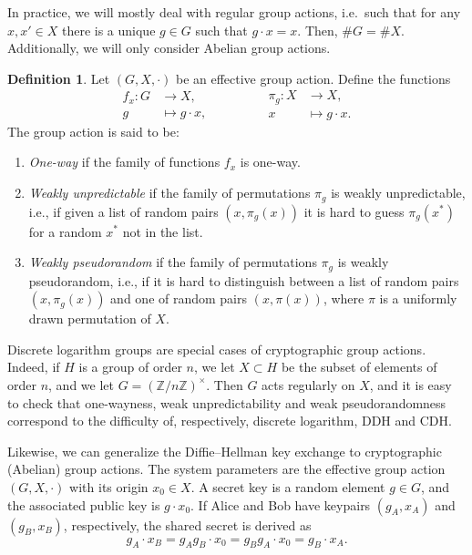 \documentclass[10pt]{article}
\theoremstyle{plain}
\theoremstyle{definition}
\newtheorem{definition}[theorem]{Definition}
\begin{document}
In practice, we will mostly deal with regular group actions, i.e.\
such that for any $x, x' ∈ X$ there is a unique $g ∈ G$ such that
$g · x = x$. %
Then, $\#G = \#X$. %
Additionally, we will only consider Abelian group actions.

\begin{definition}
  Let $(G,X,·)$ be an effective group action. %
  Define the functions
  \begin{equation*}
    \begin{aligned}
      f_x : G &\to X,\\
      g &\mapsto g·x,
    \end{aligned}
    \qquad\qquad
    \begin{aligned}
      \pi_g : X &\to X,\\
      x &\mapsto g·x.
    \end{aligned}
  \end{equation*}
  The group action is said to be:
  \begin{enumerate}
  \item \emph{One-way} if the family of functions $f_x$ is one-way.
  \item \emph{Weakly unpredictable} if the family of permutations
    $\pi_g$ is weakly unpredictable, i.e., if given a list of random
    pairs $(x,\pi_g(x))$ it is hard to guess $\pi_g(x^*)$ for a random
    $x^*$ not in the list.
  \item \emph{Weakly pseudorandom} if the family of permutations
    $\pi_g$ is weakly pseudorandom, i.e., if it is hard to distinguish
    between a list of random pairs $(x,\pi_g(x))$ and one of random
    pairs $(x,\pi(x))$, where $\pi$ is a uniformly drawn permutation
    of $X$.
  \end{enumerate}
\end{definition}

Discrete logarithm groups are special cases of cryptographic group
actions. %
Indeed, if $H$ is a group of order $n$, we let $X⊂H$ be the subset of
elements of order $n$, and we let $G = (ℤ/nℤ)^\times$. %
Then $G$ acts regularly on $X$, and it is easy to check that
one-wayness, weak unpredictability and weak pseudorandomness
correspond to the difficulty of, respectively, discrete logarithm, DDH
and CDH.

Likewise, we can generalize the Diffie--Hellman key exchange to
cryptographic (Abelian) group actions. %
The system parameters are the effective group action $(G,X,·)$ with
its origin $x_0∈X$. %
A secret key is a random element $g∈G$, and the associated public key
is $g·x_0$. %
If Alice and Bob have keypairs $(g_A,x_A)$ and $(g_B,x_B)$,
respectively, the shared secret is derived as
\begin{equation*}
  g_A·x_B = g_Ag_B· x_0 = g_Bg_A·x_0 = g_B·x_A.
\end{equation*}
\end{document}
